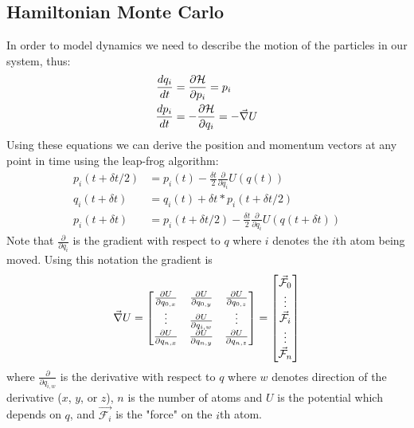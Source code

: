 \subsection{Hamiltonian Monte Carlo}
In order to model dynamics we need to describe the motion of the particles in our system, thus:
\begin{align}
  \frac{d q_{i}}{d t} &= \frac{\partial \mathcal{H}}{\partial p_{i}} = p_{i}\\
  \frac{d p_{i}}{d t} &= -\frac{\partial \mathcal{H}}{\partial q_{i}} = -\vec{\nabla} U  
\end{align}
Using these equations we can derive the position and momentum vectors at any point in time using the leap-frog algorithm:
\begin{align}
  p_{i}(t + \delta t/2) &= p_{i}(t) - \frac{\delta t}{2} \frac{\partial }{\partial q_{i}}U(q(t))\\
  q_{i}(t+\delta t)  &= q_{i}(t) + \delta t * p_{i}(t+\delta t/2)\\
  p_{i}(t+\delta t) &=   p_{i}(t + \delta t/2)- \frac{\delta t}{2} \frac{\partial }{\partial q_{i}}U(q(t+\delta t))
\end{align}
Note that $\frac{\partial}{\partial q_{i}}$ is the gradient with respect to $q$ where $i$ denotes the $i$th atom being moved.
Using this notation the gradient is
\begin{equation} \label{grad}
  \vec{\nabla} U = \begin{bmatrix}
    \frac{\partial U}{\partial q_{0, x}} & \frac{\partial U}{\partial q_{0, y}} & \frac{\partial U}{\partial q_{0, z}} \\
    \vdots & \frac{\partial U}{\partial q_{i, w}} & \vdots \\
    \frac{\partial U}{\partial q_{n, x}} & \frac{\partial U}{\partial q_{n, y}} & \frac{\partial U}{\partial q_{n, z}} \\
  \end{bmatrix} = 
  \begin{bmatrix}
    \vec{\mathcal{F}}_{0} \\
    \vdots \\
    \vec{\mathcal{F}}_{i} \\
    \vdots \\
    \vec{\mathcal{F}}_{n}\\
  \end{bmatrix}
\end{equation}
where $\frac{\partial}{\partial q_{i, w}}$ is the derivative with respect to $q$ where $w$ denotes direction of the derivative ($x$, $y$, or $z$),  $n$ is the number of atoms and $U$ is the potential which depends on $q$, and $\vec{\mathcal{F}_{i}}$ is the "force" on the $i$th atom.
